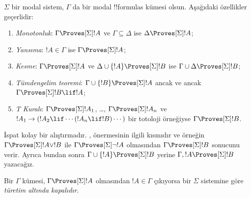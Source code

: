 \documentclass[../../../include/open-logic-section]{subfiles}
\begin{document}


\begin{prop}
  $\Sigma$ bir modal sistem, $\Gamma$ da bir modal !!{formula}s kümesi olsun.
  Aşağıdaki özellikler geçerlidir:
  \begin{enumerate}
  \item{} \emph{Monotonluk}:
    $\Gamma\Proves[\Sigma]!A$ ve $\Gamma\subseteq\Delta$ ise
    $\Delta\Proves[\Sigma]!A$;
  \item{}
    \emph{Yansıma}: $!A\in\Gamma$ ise
    $\Gamma\Proves[\Sigma]!A$;
  \item{} \emph{Kesme}:
    $\Gamma\Proves[\Sigma]!A$ ve
    $\Delta\cup\{!A\}\Proves[\Sigma]!B$ ise
    $\Gamma\cup\Delta\Proves[\Sigma]!B$;
  \item{} \emph{Tümdengelim teoremi}:
    $\Gamma\cup\{!B\}\Proves[\Sigma]!A$ ancak ve ancak
    $\Gamma\Proves[\Sigma]!B\lif !A$;
  \item {} \emph{T Kuralı}:
    $\Gamma\Proves[\Sigma]!A_1$, \dots, $\Gamma\Proves[\Sigma]!A_n$ ve
    $!A_1\to(!A_2\lif\cdots(!A_n\lif !B)\cdots)$ bir totoloji örneğiyse
    $\Gamma\Proves[\Sigma]!B$.
  \end{enumerate}
\end{prop}

İspat kolay bir alıştırmadır.
,
 önermesinin ilgili kısmıdır ve örneğin
$\Gamma\Proves[\Sigma]!A\lor !B$ ile $\Gamma\Proves[\Sigma]\lnot !A$
olmasından $\Gamma\Proves[\Sigma]!B$ sonucunu verir. Ayrıca bundan sonra
$\Gamma\cup\{!A\}\Proves[\Sigma]!B$ yerine
$\Gamma,!A\Proves[\Sigma]!B$ yazacağız.

\begin{defn}
  Bir $\Gamma$ kümesi, $\Gamma\Proves[\Sigma]!A$ olmasından
  $!A\in\Gamma$ çıkıyorsa bir $\Sigma$ sistemine göre
  \emph{türetim altında kapalıdır}.
\end{defn}
\end{document}
